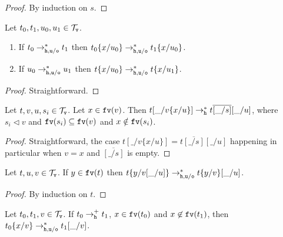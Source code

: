 \documentclass{LMCS}
\renewcommand{\>}{\rightarrow}
\newcommand{\Rewn}[2][*]{\rightarrow^{#1}_{#2}}
\newcommand{\Rewnmod}[2]{\rightarrow^*_{#1/#2}}
\newcommand{\isubs}[1]{ \{ #1  \} }
\newcommand{\Rewplus}[1]{\rightarrow^{+}_{#1}}
\newcommand{\fv}[1]{{\tt fv}(#1)}
\renewcommand{\vec}[1]{\overline{#1}}
\newcommand{\termsv}{\mathcal{T}_{\tt v}}
\newcommand{\unboxed}{{\tt u}}
\newcommand{\osym}{{\tt o}}
\newcommand{\New}{{\tt h}}
\newcommand{\void}{\_}
\newcommand{\subt}{\triangleleft}
\begin{document}
\begin{proof} By induction on $s$. 
\end{proof}



\begin{lem}
\label{l:newu-pass-to-sub} 
Let $t_0, t_1, u_0, u_1 \in \termsv$. 
\begin{enumerate}[$\bullet$]
\item If $t_0\Rewnmod{\New, \unboxed}{\osym} t_1$ then $t_0\isubs{x/u_0}
\Rewnmod{\New, \unboxed}{\osym} t_1\isubs{x/u_0}$.
\item   If $u_0\Rewnmod{\New, \unboxed}{\osym} u_1$ then $t\isubs{x/u_0}\Rewnmod{\New, \unboxed}{\osym} t\isubs{x/u_1}$.
\end{enumerate}
\end{lem}


\begin{proof}
Straightforward.
\end{proof}







\begin{lem}
\label{l:gen-new} 
Let $t,v,u,s_i \in \termsv$.
Let $x \in  \fv{v}$.
Then $t[\void/v\isubs{x/u}] \Rewn{\New}
     t\vec{[\void/s]}[\void/u]$, where  
     $s_i \subt v$ and $\fv{s_i} \subseteq \fv{v}$ and $x \notin  \fv{s_i}$.      
\end{lem}

\begin{proof}
Straightforward, the case $t[\void/v\isubs{x/u}] = 
     t\vec{[\void/s]}[\void/u]$ happening in particular
when $v = x$ and $\vec{[\void/s]}$ is empty.
\end{proof}


\begin{lem}
\label{l:out-subs}
Let $t,u,v\in\termsv$. If $y \in \fv{t}$ then
$t\isubs{y/v [\void/u]} \Rewnmod{\New, \unboxed}{\osym}  t\isubs{y/v} [\void/u]$. 
\end{lem}

\begin{proof}
By induction on $t$. 
\end{proof}



\begin{lem}
\label{l:substituion-new-u-o}
Let $t_0, t_1, v \in \termsv$. 
If $t_0 \Rewplus{\New} t_1$,
$x \in \fv{t_0}$ and $x \not \in  \fv{t_1}$,
then $t_0\isubs{x/v} 
\Rewnmod{\New,\unboxed}{\osym}
  t_1[\void/v]$. 
\end{lem}
\end{document}
